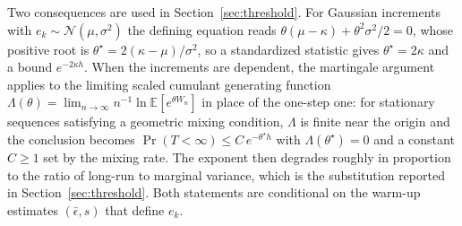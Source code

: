 \documentclass[letterpaper, 10 pt, conference]{ieeeconf}  %
\newcommand{\E}{\mathbb{E}}
\newcommand{\cN}{\mathcal{N}}
\begin{document}
Two consequences are used in Section~\ref{sec:threshold}.
For Gaussian increments with $e_k \sim \cN(\mu, \sigma^2)$ the defining equation reads $\theta(\mu - \kappa) + \theta^2\sigma^2/2 = 0$, whose positive root is $\theta^{\star} = 2(\kappa - \mu)/\sigma^2$, so a standardized statistic gives $\theta^{\star} = 2\kappa$ and a bound $e^{-2\kappa h}$.
When the increments are dependent, the martingale argument applies to the limiting scaled cumulant generating function $\Lambda(\theta) = \lim_{n \to \infty} n^{-1} \ln \E[e^{\theta W_n}]$ in place of the one-step one: for stationary sequences satisfying a geometric mixing condition, $\Lambda$ is finite near the origin and the conclusion becomes $\Pr(T < \infty) \leq C\,e^{-\theta^{\star} h}$ with $\Lambda(\theta^{\star}) = 0$ and a constant $C \geq 1$ set by the mixing rate.
The exponent then degrades roughly in proportion to the ratio of long-run to marginal variance, which is the substitution reported in Section~\ref{sec:threshold}.
Both statements are conditional on the warm-up estimates $(\bar{\epsilon}, s)$ that define $e_k$.




\end{document}
